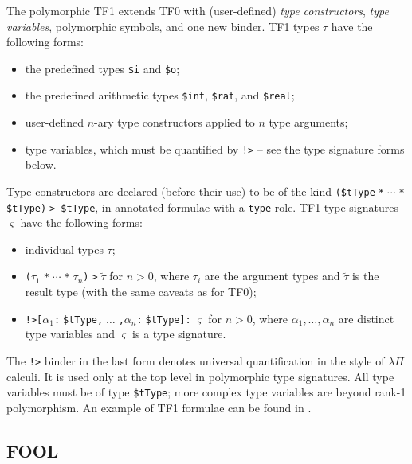 \documentclass{easychair}
\begin{document}
The polymorphic TF1 extends TF0 with (user-defined) {\em type constructors}, 
{\em type variables}, polymorphic symbols, and one new binder.
TF1 types $\tau$ have the following forms:
\begin{itemize}
\item the predefined types {\tt \$i} and {\tt \$o};
\item the predefined arithmetic types {\tt \$int}, {\tt \$rat}, and 
      {\tt \$real};
\item user-defined $n$-ary type constructors applied to $n$ type arguments;
\item type variables, which must be quantified by {\tt !>} -- see the type
      signature forms below.
\end{itemize}
Type constructors are declared (before their use) to be of the kind
{\tt (\$tType$\;$*$\;{\cdots}\;$*$\;$\$tType)$\;$> \$tType}, in annotated 
formulae with a {\tt type} role.
TF1 type signatures $\varsigma$ have the following forms:
\begin{itemize}
\item individual types $\tau$;
\item {\tt ($\tau_1\;$*$\;{\cdots}\;$*$\;\tau_n$)$\;$>$\;\tilde \tau$}
      for $n > 0$, where $\tau_i$ are the argument types and $\tilde \tau$
      is the result type (with the same caveats as for TF0);
\item {\tt !>[$\alpha_1$:$\;$\$tType,$\;{\dots}\;$,$\alpha_n$:$\;$\$tType]:$\;\varsigma$}
      for $n > 0$, where $\alpha_1,\dots,\alpha_n$ are distinct
      type variables and $\varsigma$ is a type signature.
\end{itemize}
The {\tt !>} binder in the last form denotes universal quantification in the
style of $\lambda\Pi$ calculi.
It is used only at the top level in polymorphic type signatures.
All type variables must be of type {\tt \$tType}; more complex type variables
are beyond rank-1 polymorphism.
An example of TF1 formulae can be found in \cite{KSR16}.

\subsection{FOOL}
\label{FOOL}
\end{document}
